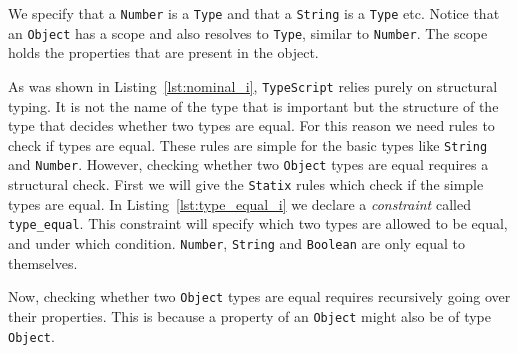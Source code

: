 \documentclass{article}
\newcommand{\ttt}[1]{\texttt{#1}}
\begin{document}
\begin{center}
    \begin{minipage}{.35\textwidth}
    
    \end{minipage}
\end{center}
We specify that a \ttt{Number} is a \ttt{Type} and that a \ttt{String} is a \ttt{Type} etc.
Notice that an \ttt{Object} has a scope and also resolves to \ttt{Type}, similar to \ttt{Number}.
The scope holds the properties that are present in the object.

As was shown in Listing~\ref{lst:nominal_i}, \ttt{TypeScript} relies purely on structural typing.
It is not the name of the type that is important but the structure of the type that decides whether two types are equal.
For this reason we need rules to check if types are equal.
These rules are simple for the basic types like \ttt{String} and \ttt{Number}.
However, checking whether two \ttt{Object} types are equal requires a structural check.
First we will give the \ttt{Statix} rules which check if the simple types are equal.
In Listing~\ref{lst:type_equal_i} we declare a \textit{constraint} called \ttt{type\_equal}.
This constraint will specify which two types are allowed to be equal, and under which condition.
\ttt{Number}, \ttt{String} and \ttt{Boolean} are only equal to themselves.

\begin{center}
    \begin{minipage}{.55\textwidth}
    
    \end{minipage}
\end{center}
Now, checking whether two \ttt{Object} types are equal requires recursively going over their properties.
This is because a property of an \ttt{Object} might also be of type \ttt{Object}.
\end{document}
